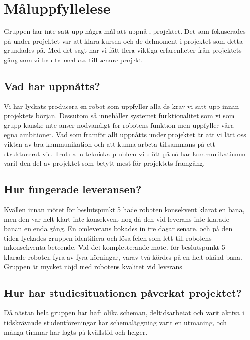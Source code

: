 \documentclass{article}
\begin{document}
\clearpage
\section{Måluppfyllelese}
Gruppen har inte satt upp några mål att uppnå i projektet. Det som fokuserades på under projektet var att klara kursen och de delmoment i projektet som detta grundades på. Med det sagt har vi fått flera viktiga erfarenheter från projektets gång som vi kan ta med oss till senare projekt.

\subsection{Vad har uppnåtts?}
Vi har lyckats producera en robot som uppfyller alla de krav vi satt upp innan projektets början. Dessutom så innehåller systemet funktionalitet som vi som grupp kanske inte anser nödvändigt för robotens funktion men uppfyller våra egna ambitioner. Vad som framför allt uppnåtts under projektet är att vi lärt oss vikten av bra kommunikation och att kunna arbeta tillsammans på ett strukturerat vis. Trots alla tekniska problem vi stött på så har kommunikationen varit den del av projektet som betytt mest för projektets framgång.

\subsection{Hur fungerade leveransen?}
Kvällen innan mötet för beslutspunkt 5 hade roboten konsekvent klarat en bana, men den var helt klart inte konsekvent nog då den vid leverans inte klarade banan en enda gång. En omleverans bokades in tre dagar senare, och på den tiden lyckades gruppen identifiera och lösa felen som lett till robotens inkonsekventa beteende. Vid det kompletterande mötet för beslutspunkt 5 klarade roboten fyra av fyra körningar, varav två kördes på en helt okänd bana. Gruppen är mycket nöjd med robotens kvalitet vid leverans.

\subsection{Hur har studiesituationen påverkat projektet?}
Då nästan hela gruppen har haft olika scheman, deltidsarbetat och varit aktiva i tidskrävande studentföreningar har schemaläggning varit en utmaning, och många timmar har lagts på kvällstid och helger. 

\clearpage
\end{document}
